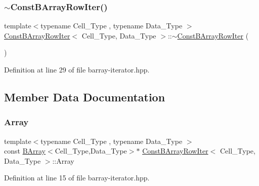 \subsubsection{\texorpdfstring{$\sim$\+Const\+B\+Array\+Row\+Iter()}{~ConstBArrayRowIter()}}
{\footnotesize\ttfamily template$<$typename Cell\+\_\+\+Type , typename Data\+\_\+\+Type $>$ \\
\hyperlink{class_const_b_array_row_iter}{Const\+B\+Array\+Row\+Iter}$<$ Cell\+\_\+\+Type, Data\+\_\+\+Type $>$\+::$\sim$\hyperlink{class_const_b_array_row_iter}{Const\+B\+Array\+Row\+Iter} (\begin{DoxyParamCaption}{ }\end{DoxyParamCaption})\hspace{0.3cm}{\ttfamily [inline]}}



Definition at line 29 of file barray-\/iterator.\+hpp.



\subsection{Member Data Documentation}
\mbox{\label{class_const_b_array_row_iter_ae7f5ef61225621953a664e73c6153ed3}} 
\subsubsection{\texorpdfstring{Array}{Array}}
{\footnotesize\ttfamily template$<$typename Cell\+\_\+\+Type , typename Data\+\_\+\+Type $>$ \\
const \hyperlink{class_b_array}{B\+Array}$<$Cell\+\_\+\+Type,Data\+\_\+\+Type$>$$\ast$ \hyperlink{class_const_b_array_row_iter}{Const\+B\+Array\+Row\+Iter}$<$ Cell\+\_\+\+Type, Data\+\_\+\+Type $>$\+::Array}



Definition at line 15 of file barray-\/iterator.\+hpp.

\mbox{\label{class_const_b_array_row_iter_a1cc52bf86768fc2438f1f13df70d3679}} 
